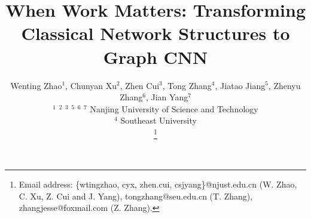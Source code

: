 \documentclass[journal]{IEEEtran}
\begin{document}
\title{When Work Matters: Transforming Classical Network Structures to Graph CNN}



\author{
	Wenting Zhao$^1$,
	Chunyan Xu$^2$,
	Zhen Cui$^3$,
	Tong Zhang$^4$,
	Jiatao Jiang$^5$,
	Zhenyu Zhang$^6$,
	Jian Yang$^7$
	\\
	$^1$ $^2$ $^3$ $^5$ $^6$ $^7$ Nanjing University of Science and Technology
    \\
	$^4$ Southeast University




	
\thanks{Email address: \{wtingzhao, cyx, zhen.cui, csjyang\}@njust.edu.cn (W. Zhao, C. Xu, Z. Cui and J. Yang), tongzhang@seu.edu.cn (T. Zhang), zhangjesse@foxmail.com (Z. Zhang).}



}






















\maketitle
\end{document}
